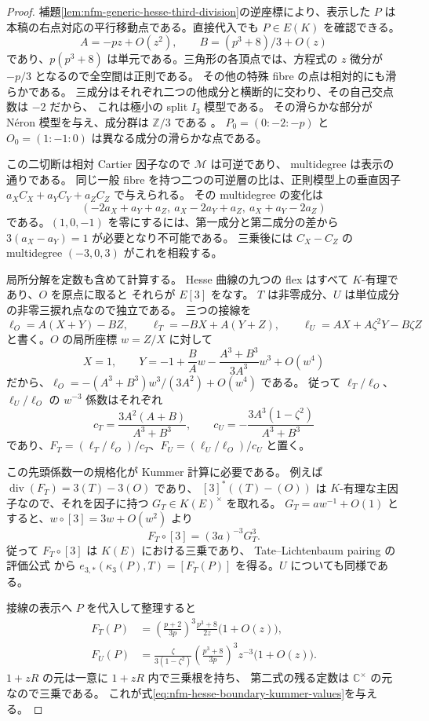 \begin{proof}
補題\ref{lem:nfm-generic-hesse-third-division}の逆座標により、表示した $P$ は
本稿の右点対応の平行移動点である。直接代入でも $P\in E(K)$ を確認できる。
\[
 A=-pz+O(z^2),\qquad B=(p^3+8)/3+O(z)
\]
であり、$p(p^3+8)$ は単元である。三角形の各頂点では、方程式の
$z$ 微分が $-p/3$ となるので全空間は正則である。
その他の特殊 fibre の点は相対的にも滑らかである。
三成分はそれぞれ二つの他成分と横断的に交わり、その自己交点数は $-2$ だから、
これは極小の split $I_3$ 模型である。
その滑らかな部分が N\'eron 模型を与え、成分群は $\mathbb Z/3$ である
\cite[Appendix~C, Theorems~15.1--15.2]{NFMSilvermanArithmetic}。
$P_0=(0:-2:-p)$ と $O_0=(1:-1:0)$ は異なる成分の滑らかな点である。

この二切断は相対 Cartier 因子なので $\mathcal M$ は可逆であり、
multidegree は表示の通りである。
同じ一般 fibre を持つ二つの可逆層の比は、正則模型上の垂直因子
$a_XC_X+a_YC_Y+a_ZC_Z$ で与えられる。
その multidegree の変化は
\[
 (-2a_X+a_Y+a_Z,\ a_X-2a_Y+a_Z,\ a_X+a_Y-2a_Z)
\]
である。$(1,0,-1)$ を零にするには、第一成分と第二成分の差から
$3(a_X-a_Y)=1$ が必要となり不可能である。
三乗後には $C_X-C_Z$ の multidegree $(-3,0,3)$ がこれを相殺する。

局所分解を定数も含めて計算する。
Hesse 曲線の九つの flex はすべて $K$-有理であり、$O$ を原点に取ると
それらが $E[3]$ をなす。
$T$ は非零成分、$U$ は単位成分の非零三捩れ点なので独立である。
三つの接線を
\[
 \ell_O=A(X+Y)-BZ,\qquad
 \ell_T=-BX+A(Y+Z),\qquad
 \ell_U=AX+A\zeta^2Y-B\zeta Z
\]
と書く。$O$ の局所座標 $w=Z/X$ に対して
\[
 X=1,\qquad
 Y=-1+\frac BA w-\frac{A^3+B^3}{3A^3}w^3+O(w^4)
\]
だから、$\ell_O=-(A^3+B^3)w^3/(3A^2)+O(w^4)$ である。
従って $\ell_T/\ell_O$、$\ell_U/\ell_O$ の $w^{-3}$ 係数はそれぞれ
\[
 c_T=\frac{3A^2(A+B)}{A^3+B^3},\qquad
 c_U=-\frac{3A^3(1-\zeta^2)}{A^3+B^3}
\]
であり、$F_T=(\ell_T/\ell_O)/c_T$、$F_U=(\ell_U/\ell_O)/c_U$ と置く。

この先頭係数一の規格化が Kummer 計算に必要である。
例えば $\operatorname{div}(F_T)=3(T)-3(O)$ であり、
$[3]^*((T)-(O))$ は $K$-有理な主因子なので、それを因子に持つ
$G_T\in K(E)^\times$ を取れる。
$G_T=a w^{-1}+O(1)$ とすると、$w\circ[3]=3w+O(w^2)$ より
\[
 F_T\circ[3]=(3a)^{-3}G_T^3.
\]
従って $F_T\circ[3]$ は $K(E)$ における三乗であり、
Tate--Lichtenbaum pairing の評価公式
\cite[Chapter~XI, Proposition~9.2]{NFMSilvermanArithmetic}から
$e_{3,*}(\kappa_3(P),T)=[F_T(P)]$ を得る。$U$ についても同様である。

接線の表示へ $P$ を代入して整理すると
\begin{align*}
 F_T(P)&=
 \left(\frac{p+2}{3p}\right)^3
 \frac{p^3+8}{2z}\bigl(1+O(z)\bigr),\\
 F_U(P)&=
 \frac{\zeta}{3(1-\zeta^2)}
 \left(\frac{p^3+8}{3p}\right)^3z^{-3}
 \bigl(1+O(z)\bigr).
\end{align*}
$1+zR$ の元は一意に $1+zR$ 内で三乗根を持ち、
第二式の残る定数は $\mathbb C^\times$ の元なので三乗である。
これが式\eqref{eq:nfm-hesse-boundary-kummer-values}を与える。


\end{proof}
